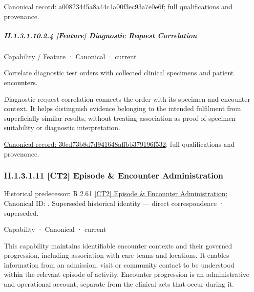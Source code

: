 {\footnotesize \href{../../../../../../../continuum/strategy/capability/feature/a00823445a8a44c1a00f3ec93a7e0e6f.md}{Canonical record: a00823445a8a44c1a00f3ec93a7e0e6f}; full qualifications and provenance.}\par
\subparagraph*{II.1.3.1.10.2.4 [Feature] Diagnostic Request Correlation}
\label{navigation:II.1.3.1.10.2.4}

\label{element:30cd73b8d7d941648affbb379196f532}
{\small Capability / Feature · Canonical · current}\par

Correlate diagnostic test orders with collected clinical specimens and patient encounters.



Diagnostic request correlation connects the order with its specimen and encounter context. It helps distinguish evidence belonging to the intended fulfilment from superficially similar results, without treating association as proof of specimen suitability or diagnostic interpretation.


{\footnotesize \href{../../../../../../../continuum/strategy/capability/feature/30cd73b8d7d941648affbb379196f532.md}{Canonical record: 30cd73b8d7d941648affbb379196f532}; full qualifications and provenance.}\par
\subsubsection*{II.1.3.1.11 [CT2] Episode \& Encounter Administration}
\label{navigation:II.1.3.1.11}

{\small Historical predecessor: R.2.61 \hyperref[element:2778f988e8d44e3091749542c39d38a4]{[CT2] Episode \& Encounter Administration}; Canonical ID: \texttt{}. Superseded historical identity — direct correspondence · superseded.}\par
\label{element:61d7067aee0540259b3daca4287d66d2}
{\small Capability · Canonical · current}\par

This capability maintains identifiable encounter contexts and their governed progression, including association with care teams and locations. It enables information from an admission, visit or community contact to be understood within the relevant episode of activity. Encounter progression is an administrative and operational account, separate from the clinical acts that occur during it.



